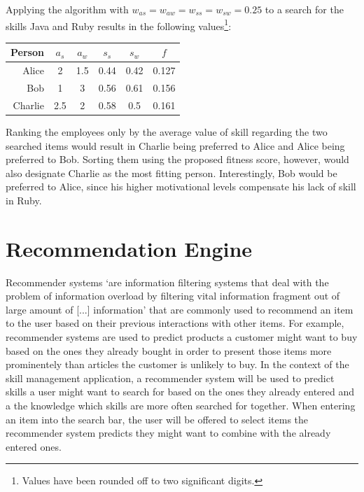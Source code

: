 Applying the algorithm with $w_{as} = w_{aw} = w_{ss} = w_{sw} = 0.25$ to a search for the skills Java and Ruby results in the following values\footnote{Values have been rounded off to two significant digits.}:


\begin{center}
\begin{tabular}{r|ccccc}
  Person  & $a_s$ & $a_w$ & $s_s$ & $s_w$ & $f$\\
  \hline
  Alice   & 2   & 1.5 & 0.44 & 0.42 & 0.127\\
  Bob     & 1   & 3   & 0.56 & 0.61 & 0.156\\
  Charlie & 2.5 & 2   & 0.58 & 0.5  & 0.161\\
\end{tabular}
\end{center}

Ranking the employees only by the average value of skill regarding the two searched items would result in Charlie being preferred to Alice and Alice being preferred to Bob. Sorting them using the proposed fitness score, however, would also designate Charlie as the most fitting person. Interestingly, Bob would be preferred to Alice, since his higher motivational levels compensate his lack of skill in Ruby.

\section{Recommendation Engine}
Recommender systems `are information filtering systems that deal with the problem of information overload by filtering vital information fragment out of large amount of [...] information'\cite{Isinkaye2015261} that are commonly used to recommend an item to the user based on their previous interactions with other items. For example, recommender systems are used to predict products a customer might want to buy based on the ones they already bought in order to present those items
more prominentely than articles the customer is unlikely to buy. In the context of the skill management application, a recommender system will be used to predict skills a user might want to search for based on the ones they already entered and a the knowledge which skills are more often searched for together.
When entering an item into the search bar, the user will be offered to select items the recommender system predicts they might want to combine with the already entered ones.


